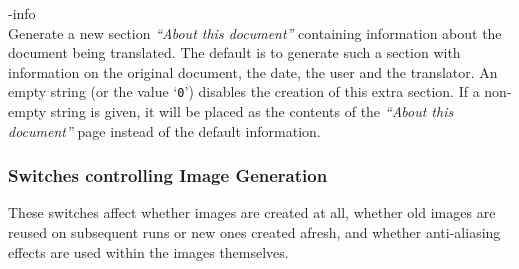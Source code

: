 \begin{htmllist}

\item [ -info \Meta{string}\label{cs_infostring}]
\\
Generate a new section \emph{``About this document'' } containing information
about the document being translated. The default is to generate such a section
with information on the original document, the date, the user and the translator.
An empty string (or the value `\texttt{0}')
disables the creation of this extra section.\html{\\}
If a non-empty string is given, it will be placed as the contents of the
\emph{``About this document'' } page instead of the default information.
%
\end{htmllist}


\subsubsection{Switches controlling Image Generation}
%
These switches affect whether images are created at all, whether
old images are reused on subsequent runs or new ones created afresh,
and whether anti-aliasing effects are used within the images themselves.


